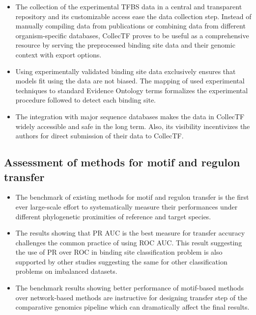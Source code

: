 \documentclass[12pt]{article}
\begin{document}
\begin{itemize}
\item The collection of the experimental TFBS data in a central and transparent
  repository and its customizable access ease the data collection step. Instead
  of manually compiling data from publications or combining data from different
  organism-specific databases, CollecTF proves to be useful as a comprehensive
  resource  by serving the preprocessed binding site data and their
  genomic context with export options.

\item Using experimentally validated binding site data exclusively ensures that
  models fit using the data are not biased. The mapping of used experimental
  techniques to standard Evidence Ontology terms formalizes the experimental
  procedure followed to detect each binding site.

\item The integration with major sequence databases makes the data in CollecTF
  widely accessible and safe in the long term. Also, its visibility
  incentivizes the authors for direct submission of their data to CollecTF.
\end{itemize}

\subsection{Assessment of methods for motif and regulon transfer}

\begin{itemize}
\item The benchmark of existing methods for motif and regulon transfer is the
  first ever large-scale effort to systematically measure their performances
  under different phylogenetic proximities of reference and target species.

\item The results showing that PR AUC is the best measure for transfer accuracy
  challenges the common practice of using ROC AUC\@. This result suggesting the
  use of PR over ROC in binding site classification problem is also supported
  by other studies suggesting the same for other classification problems on
  imbalanced datasets.

\item The benchmark results showing better performance of motif-based methods
  over network-based methods are instructive for designing transfer step of the
  comparative genomics pipeline which can dramatically affect the final results.
\end{itemize}
\end{document}
